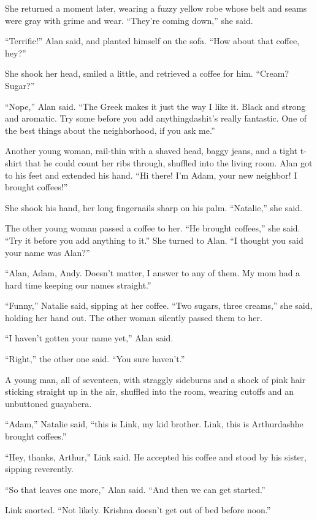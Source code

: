 She returned a moment later, wearing a fuzzy yellow robe whose belt
and seams were gray with grime and wear.  ``They're coming down,'' she
said.

``Terrific!'' Alan said, and planted himself on the sofa.  ``How about
that coffee, hey?''

She shook her head, smiled a little, and retrieved a coffee for him. 
``Cream?  Sugar?''

``Nope,'' Alan said.  ``The Greek makes it just the way I like it. 
Black and strong and aromatic.  Try some before you add
anythingdash{}it's really fantastic.  One of the best things about the
neighborhood, if you ask me.''

Another young woman, rail-thin with a shaved head, baggy jeans, and a
tight t-shirt that he could count her ribs through, shuffled into the
living room.  Alan got to his feet and extended his hand.  ``Hi there! 
I'm Adam, your new neighbor!  I brought coffees!''

She shook his hand, her long fingernails sharp on his palm. 
``Natalie,'' she said.

The other young woman passed a coffee to her.  ``He brought coffees,''
she said.  ``Try it before you add anything to it.'' She turned to
Alan.  ``I thought you said your name was Alan?''

``Alan, Adam, Andy.  Doesn't matter, I answer to any of them.  My mom
had a hard time keeping our names straight.''

``Funny,'' Natalie said, sipping at her coffee.  ``Two sugars, three
creams,'' she said, holding her hand out.  The other woman silently
passed them to her.

``I haven't gotten your name yet,'' Alan said.

``Right,'' the other one said.  ``You sure haven't.''

A young man, all of seventeen, with straggly sideburns and a shock of
pink hair sticking straight up in the air, shuffled into the room,
wearing cutoffs and an unbuttoned guayabera.

``Adam,'' Natalie said, ``this is Link, my kid brother.  Link, this is
Arthurdash{}he brought coffees.''

``Hey, thanks, Arthur,'' Link said.  He accepted his coffee and stood
by his sister, sipping reverently.

``So that leaves one more,'' Alan said.  ``And then we can get
started.''

Link snorted.  ``Not likely.  Krishna doesn't get out of bed before
noon.''


